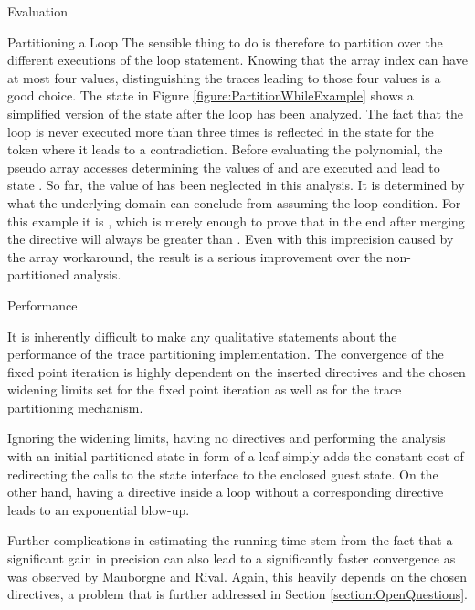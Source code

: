 \begin{chapter}{Evaluation}
\begin{section}{Partitioning a Loop}
		The sensible thing to do is therefore to partition over the different executions of the loop statement. Knowing that the array index can have at most four values, distinguishing the traces leading to those four values is a good choice. The state \one in Figure \ref{figure:PartitionWhileExample} shows a simplified version of the state after the loop has been analyzed. The fact that the loop is never executed more than three times is reflected in the state for the token  where it leads to a contradiction. Before evaluating the polynomial, the pseudo array accesses determining the values of  and  are executed and lead to state \two. So far, the value of  has been neglected in this analysis. It is determined by what the underlying domain can conclude from assuming the loop condition. For this example it is , which is merely enough to prove that in the end after merging the directive  will always be greater than . Even with this imprecision caused by the array workaround, the result is a serious improvement over the non-partitioned analysis.

	\end{section}


	\begin{section}{Performance}
		\label{section:Performance}

		It is inherently difficult to make any qualitative statements about the performance of the trace partitioning implementation. The convergence of the fixed point iteration is highly dependent on the inserted directives and the chosen widening limits set for the fixed point iteration as well as for the trace partitioning mechanism. 

		Ignoring the widening limits, having no directives and performing the analysis with an initial partitioned state in form of a leaf simply adds the constant cost of redirecting the calls to the state interface to the enclosed guest state. On the other hand, having a  directive inside a loop without a corresponding  directive leads to an exponential blow-up. 

		Further complications in estimating the running time stem from the fact that a significant gain in precision can also lead to a significantly faster convergence as was observed by Mauborgne and Rival. Again, this heavily depends on the chosen directives, a problem that is further addressed in Section \ref{section:OpenQuestions}.


\end{section}
\end{chapter}
